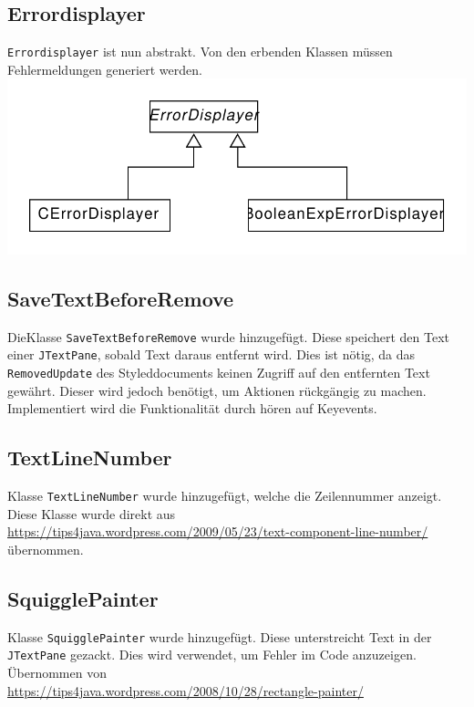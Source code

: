 \documentclass[a4paper]{scrreprt}
\begin{document}
\subsection{Errordisplayer}
\verb!Errordisplayer! ist nun abstrakt. Von den erbenden Klassen müssen Fehlermeldungen generiert werden.\\
\includegraphics[scale=0.5]{Errordisplayer_update.pdf}\\
\subsection{SaveTextBeforeRemove}
DieKlasse \verb!SaveTextBeforeRemove! wurde hinzugefügt. Diese speichert den Text einer \verb!JTextPane!, sobald Text daraus entfernt wird. Dies ist nötig, da das \verb!RemovedUpdate! des Styleddocuments keinen Zugriff auf den entfernten Text gewährt. Dieser wird jedoch benötigt, um Aktionen rückgängig zu machen. Implementiert wird die Funktionalität durch hören auf Keyevents.\\
\subsection{TextLineNumber}
Klasse \verb!TextLineNumber! wurde hinzugefügt, welche die Zeilennummer anzeigt. Diese Klasse wurde direkt aus\\ \url{https://tips4java.wordpress.com/2009/05/23/text-component-line-number/}\\ übernommen.\\
\subsection{SquigglePainter}
Klasse \verb!SquigglePainter! wurde hinzugefügt. Diese unterstreicht Text in der \verb!JTextPane! gezackt. Dies wird verwendet, um Fehler im Code anzuzeigen. Übernommen von\\
\url{https://tips4java.wordpress.com/2008/10/28/rectangle-painter/}\\
\end{document}
